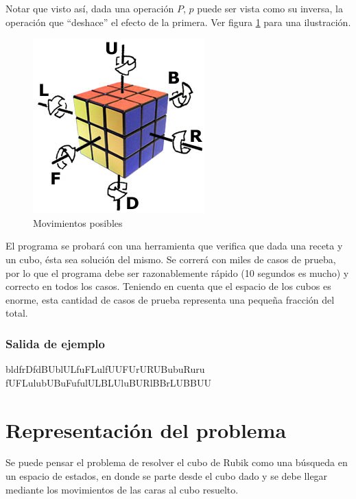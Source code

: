 \documentclass[11pt,a4paper]{article}
\begin{document}
Notar que visto así, dada una operación $P$, $p$ puede ser vista como su inversa, la operación que ``deshace'' el efecto de la primera. Ver figura \ref{fig:ejemplo} para una ilustración. \\

\begin{figure}
  \centering
    \includegraphics{img/giros}
  \caption{Movimientos posibles}
  \label{fig:ejemplo}
\end{figure}

El programa se probará con una herramienta que verifica que dada una receta y un cubo, ésta sea solución del mismo. Se correrá con miles de casos de prueba, por lo que el programa debe ser razonablemente rápido (10 segundos es mucho) y correcto en todos los casos. Teniendo en cuenta que el espacio de los cubos es enorme, esta cantidad de casos de prueba representa una pequeña fracción del total.

\subsubsection{Salida de ejemplo}
\begin{center}
\begin{verbbox}
bldfrDfdBUblULfuFLulfUUFUrURUBubuRuru
fUFLulubUBuFufulULBLUluBURlBBrLUBBUU
\end{verbbox}
\theverbbox
\end{center}

\section{Representación del problema}

Se puede pensar el problema de resolver el cubo de Rubik como una búsqueda en un espacio de estados, en donde se parte desde el cubo dado y se debe llegar mediante los movimientos de las caras al cubo resuelto.
\end{document}
